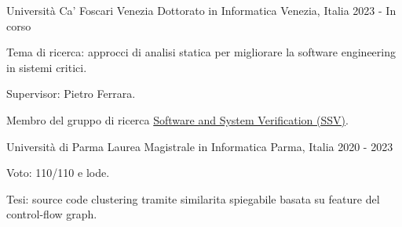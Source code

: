 
\begin{cventries}

  \cventry
    {Università Ca' Foscari Venezia} %
    {Dottorato in Informatica} %
    {Venezia, Italia} %
    {2023 - In corso} %
    {
        \begin{cvitems} %
        \item {Tema di ricerca: approcci di analisi statica per migliorare la software engineering in sistemi critici.}
        \item {Supervisor: Pietro Ferrara.}
        \item {Membro del gruppo di ricerca \href{https://unive-ssv.github.io/}{Software and System Verification (SSV)}.}
        \end{cvitems}
    }

  \cventry
    {Università di Parma} %
    {Laurea Magistrale in Informatica} %
    {Parma, Italia} %
    {2020 - 2023} %
    {
      \begin{cvitems} %
        \item {Voto: 110/110 e lode.}
        \item {Tesi: source code clustering tramite similarita spiegabile basata su feature del control-flow graph.}
      \end{cvitems}
    }


\end{cventries}
